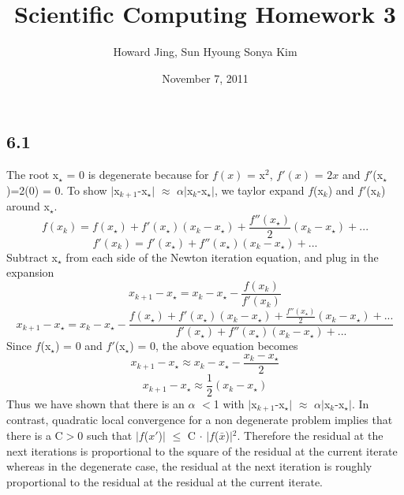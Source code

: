 \documentclass[11pt]{amsart}
\title{Scientific Computing Homework 3}
\author{Howard Jing, Sun Hyoung Sonya Kim}
\date{November 7, 2011}                                           %
\begin{document}
\maketitle
\subsection*{6.1}

The root x$_{\star}$ = 0 is degenerate because for $f(x)$ = x$^{2}$, $f'(x)$ = $2x$ and $f'$(x$_{\star}$)=2(0) = 0. To show $|$x$_{k+1}$-x$_{\star}$$|$ $\approx$ $\alpha$$|$x$_{k}$-x$_{\star}$$|$, we taylor expand $f$(x$_{k}$) and $f'$(x$_{k}$) around x$_{\star}$. 
\[
f(x_{k}) = f(x_{\star})+f'(x_{\star})(x_{k}-x_{\star})+\frac{f''(x_{\star})}{2}(x_{k}-x_{\star})+ ...
\]
\[
f'(x_{k}) = f'(x_{\star})+f''(x_{\star})(x_{k}-x_{\star})+...
\]
\newline
Subtract x$_{\star}$ from each side of the Newton iteration equation, and plug in the expansion 
\[
x_{k+1}-x_{\star}=x_{k}-x_{\star}-\frac{f(x_{k})}{f'(x_{k})}
\]
\[
x_{k+1}-x_{\star} = x_{k}-x_{\star}-\frac{f(x_{\star})+f'(x_{\star})(x_{k}-x_{\star})+\frac{f''(x_{\star})}{2}(x_{k}-x_{\star})+ ...}{f'(x_{\star})+f''(x_{\star})(x_{k}-x_{\star})+...}
\]
\newline
Since $f$(x$_{\star}$) = 0 and $f'$(x$_{\star}$) = 0, the above equation becomes
\[
x_{k+1}-x_{\star} \approx x_{k}-x_{\star}-\frac{x_{k}-x_{\star}}{2}
\]
\[
x_{k+1}-x_{\star} \approx \frac{1}{2}(x_{k}-x_{\star})
\]
\newline
Thus we have shown that there is an $\alpha$ $<$1 with $|$x$_{k+1}$-x$_{\star}$$|$ $\approx$ $\alpha$$|$x$_{k}$-x$_{\star}$$|$.
\newline
\newline
In contrast, quadratic local convergence for a non degenerate problem implies that there is a C$>$0 such that $|$$f$($x$$'$)$|$ $\le$ C $\cdot$ $|$$f$($\bar{x}$)$|$$^{2}$. Therefore the residual at the next iterations is proportional to the square of the residual at the current iterate whereas in the degenerate case, the residual at the next iteration is roughly proportional to the residual at the residual at the current iterate. 
\end{document}
